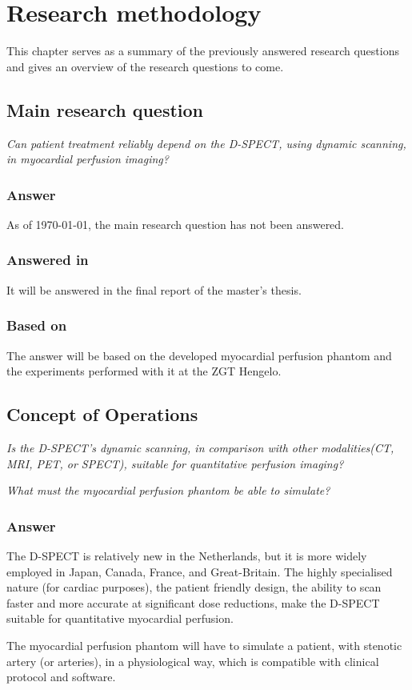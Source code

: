 \chapter{Research methodology}
This chapter serves as a summary of the previously answered research questions and gives an overview of the research questions to come.
\section{Main research question}
\textit{Can patient treatment reliably depend on the D-SPECT, using dynamic scanning, in myocardial perfusion imaging?}
\subsection*{Answer}
As of \today, the main research question has not been answered.
\subsection*{Answered in}
It will be answered in the final report of the master's thesis.
\subsection*{Based on}
The answer will be based on the developed myocardial perfusion phantom and the experiments performed with it at the ZGT Hengelo.
\section{Concept of Operations}
\label{sec:concept_oper}
\textit{Is the D-SPECT's dynamic scanning, in comparison with other modalities(CT, MRI, PET, or SPECT), suitable for quantitative perfusion imaging?}

\textit{What must the myocardial perfusion phantom be able to simulate?}
\subsection*{Answer}
The D-SPECT is relatively new in the Netherlands, but it is more widely employed in Japan, Canada, France, and Great-Britain. The highly specialised nature (for cardiac purposes), the patient friendly design, the ability to scan faster and more accurate at significant dose reductions, make the D-SPECT suitable for quantitative myocardial perfusion.

The myocardial perfusion phantom will have to simulate a patient, with stenotic artery (or arteries), in a physiological way, which is compatible with clinical protocol and software.
